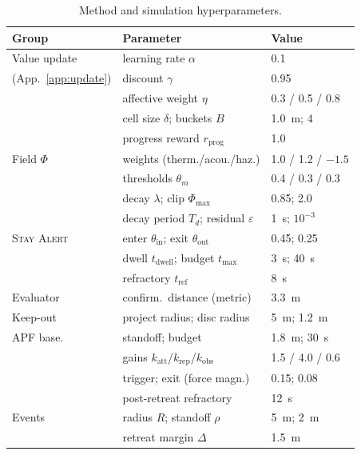 \begin{table}[t]
\centering
\caption{Method and simulation hyperparameters.}
\label{tab:hyper}
\begin{tabular}{lll}
\hline
\textbf{Group} & \textbf{Parameter} & \textbf{Value}\\
\hline
Value update & learning rate $\alpha$ & 0.1\\
(App.~\ref{app:update}) & discount $\gamma$ & 0.95\\
          & affective weight $\eta$ & 0.3 / 0.5 / 0.8\\
          & cell size $\delta$; buckets $B$ & 1.0~m; 4\\
          & progress reward $r_{\text{prog}}$ & 1.0\\
Field $\Phi$ & weights (therm./acou./haz.) & 1.0 / 1.2 / $-1.5$\\
          & thresholds $\theta_m$ & 0.4 / 0.3 / 0.3\\
          & decay $\lambda$; clip $\Phi_{\max}$ & 0.85; 2.0\\
          & decay period $T_d$; residual $\varepsilon$ & 1~s; $10^{-3}$\\
\textsc{Stay Alert} & enter $\theta_{\text{in}}$; exit $\theta_{\text{out}}$ & 0.45; 0.25\\
          & dwell $t_{\text{dwell}}$; budget $t_{\max}$ & 3~s; 40~s\\
          & refractory $t_{\text{ref}}$ & 8~s\\
Evaluator & confirm.\ distance (metric) & 3.3~m\\
Keep-out   & project radius; disc radius & 5~m; 1.2~m\\
APF base. & standoff; budget & 1.8~m; 30~s\\
          & gains $k_{\text{att}}$/$k_{\text{rep}}$/$k_{\text{obs}}$ & 1.5 / 4.0 / 0.6\\
          & trigger; exit (force magn.) & 0.15; 0.08\\
          & post-retreat refractory & 12~s\\
Events    & radius $R$; standoff $\rho$ & 5~m; 2~m\\
          & retreat margin $\Delta$ & 1.5~m\\
\hline
\end{tabular}
\end{table}

